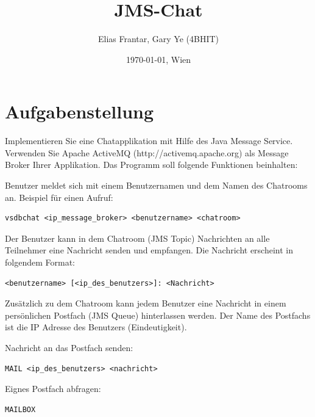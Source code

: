 \documentclass[11pt, a4paper]{article}
\title{JMS-Chat}
\author{Elias Frantar, Gary Ye (4BHIT)}
\date{\today{}, Wien}
\begin{document}
\lstset{basicstyle=\ttfamily\small,
        keywordstyle=,
        commentstyle=\itshape,
        numbers=left,                   %
        stepnumber=1,					%
        breaklines=true,					%
        numberstyle=\tiny,				%
        showstringspaces=false,			
        abovecaptionskip=0pt,
        belowcaptionskip=0pt,
        xleftmargin=\parindent,
        fontadjust}

\maketitle
\newpage
\tableofcontents
\newpage

\section{Aufgabenstellung}
Implementieren Sie eine Chatapplikation mit Hilfe des Java Message Service. Verwenden Sie Apache ActiveMQ (http://activemq.apache.org) als Message Broker Ihrer Applikation. Das Programm soll folgende Funktionen beinhalten:

Benutzer meldet sich mit einem Benutzernamen und dem Namen des Chatrooms an. 
Beispiel für einen Aufruf: 

\begin{lstlisting}
vsdbchat <ip_message_broker> <benutzername> <chatroom>
\end{lstlisting}

Der Benutzer kann in dem Chatroom (JMS Topic) Nachrichten an alle Teilnehmer eine Nachricht senden und empfangen. 
Die Nachricht erscheint in folgendem Format:
\begin{lstlisting}
<benutzername> [<ip_des_benutzers>]: <Nachricht>
\end{lstlisting}

Zusätzlich zu dem Chatroom kann jedem Benutzer eine Nachricht in einem persönlichen Postfach (JMS Queue) hinterlassen werden. Der Name des Postfachs ist die IP Adresse des Benutzers (Eindeutigkeit).

Nachricht an das Postfach senden: 
\begin{lstlisting}
MAIL <ip_des_benutzers> <nachricht>
\end{lstlisting}

Eignes Postfach abfragen: 
\begin{lstlisting}
MAILBOX
\end{lstlisting}
\end{document}
